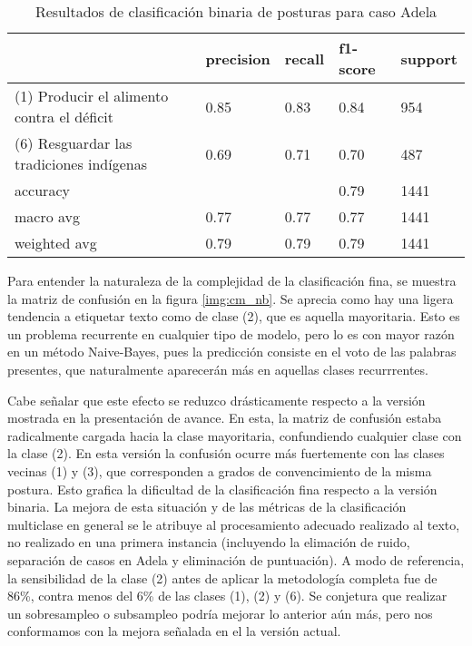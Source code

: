 \documentclass[
	spanish, %
	letterpaper, oneside
]{article}
\begin{document}
\begin{table}[htbp]
\centering
\caption{Resultados de clasificación binaria de posturas para caso Adela}
\begin{tabular}{|l|l|l|l|l|}
\hline
\textbf{}    & \textbf{precision} & \textbf{recall} & \textbf{f1-score} & \textbf{support} \\ \hline
(1) Producir el alimento contra el déficit            & 0.85               & 0.83            & 0.84              & 954              \\ \hline
(6) Resguardar las tradiciones indígenas            & 0.69               & 0.71            & 0.70              & 487               \\ \hline
accuracy     &                    &                 & 0.79              & 1441             \\ \hline
macro avg    & 0.77               & 0.77            & 0.77              & 1441             \\ \hline
weighted avg & 0.79               & 0.79            & 0.79              & 1441             \\ \hline
\end{tabular}
\label{tab:detalle_adela_bin}
\end{table}


\newp Para entender la naturaleza de la complejidad de la clasificación fina, se muestra la matriz de confusión en la figura \ref{img:cm_nb}. Se aprecia como hay una ligera tendencia a etiquetar texto como de clase (2), que es aquella mayoritaria. Esto es un problema recurrente en cualquier tipo de modelo, pero lo es con mayor razón en un método Naive-Bayes, pues la predicción consiste en el voto de las palabras presentes, que naturalmente aparecerán más en aquellas clases recurrrentes. 

\newp Cabe señalar que este efecto se reduzco drásticamente respecto a la versión mostrada en la presentación de avance. En esta, la matriz de confusión estaba radicalmente cargada hacia la clase mayoritaria, confundiendo cualquier clase con la clase (2). En esta versión la confusión ocurre más fuertemente con las clases vecinas (1) y (3), que corresponden a grados de convencimiento de la misma postura. Esto grafica la dificultad de la clasificación fina respecto a la versión binaria. La mejora de esta situación y de las métricas de la clasificación multiclase en general se le atribuye al procesamiento adecuado realizado al texto, no realizado en una primera instancia (incluyendo la elimación de ruido, separación de casos en Adela y eliminación de puntuación). A modo de referencia, la sensibilidad de la clase (2) antes de aplicar la metodología completa fue de 86\%, contra menos del 6\% de las clases (1), (2) y (6). Se conjetura que realizar un sobresampleo o subsampleo podría mejorar lo anterior aún más, pero nos conformamos con la mejora señalada en el la versión actual.
\end{document}
